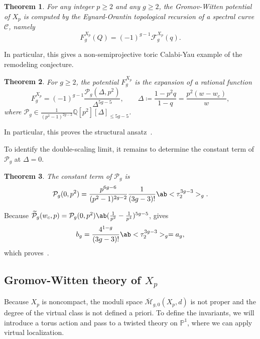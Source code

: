 \documentclass{amsart}
\newtheorem{thm}{Theorem}[section]
\theoremstyle{definition}
\theoremstyle{remark}
\theoremstyle{plain}
\theoremstyle{definition}
\theoremstyle{remark}
\newcommand{\Q}{\mathbb{Q}}
\renewcommand{\P}{\mathbb{P}}
\newcommand{\Mbar}{\overline{\mathcal{M}}}
\newcommand{\mc}[1]{\mathcal{#1}}
\newcommand{\wt}[1]{\widetilde{#1}}
\newcommand{\1}{\mathbf{1}}
\newcommand{\2}{\mathbf{2}}
\newcommand{\3}{\mathbf{3}}
\begin{document}
\begin{thm}%
\label{thm:local P1 mirror symmetry}
    For any integer \(p \geq 2\) and any \(g \geq 2\), the Gromov-Witten potential of \(X_p\) is computed by the Eynard-Orantin topological recursion of a spectral curve \(\mc{C}\), namely
    \[ F_g^{X_p}(Q) = (-1)^{g-1}\mc{F}_g^{X_p}(q). \]
\end{thm}

In particular, this gives a non-semiprojective toric Calabi-Yau example of the remodeling conjecture.

\begin{thm}%
\label{thm:local P1 rationality}
    For \(g \geq 2\), the potential \(F_g^{X_p}\) is the expansion of a rational function
    \[ F_g^{X_p} = (-1)^{g-1}\frac{\mc{P}_g(\Delta,p^2)}{\Delta^{5g-5}}, \qquad \Delta \coloneqq \frac{1-p^2q}{1-q} = \frac{p^2(w-w_c)}{w}, \]
    where \(\mc{P}_g \in \frac{1}{(p^2-1)^{2g-2}}\Q[p^2][\Delta]_{\leq 5g-5}\).
\end{thm}

In particular, this proves the structural ansatz~.

To identify the double-scaling limit, it remains to determine the constant term of \(\mc{P}_g\) at \(\Delta = 0\).

\begin{thm}%
\label{thm:local P1 constant term}
    The constant term of \(\mc{P}_g\) is
    \[ \mc{P}_g(0,p^2) = \frac{p^{6g-6}}{(p^2-1)^{2g-2}}\frac{1}{(3g-3)!}\ab<\tau_2^{3g-3}>_g. \]
\end{thm}

Because \(\wt{\mc{P}}_g(w_c,p) = \mc{P}_g(0,p^2)\ab(\frac{1}{p^2}-\frac{1}{p^4})^{5g-5}\),  gives
\[ b_g = \frac{4^{1-g}}{(3g-3)!}\ab<\tau_2^{3g-3}>_g = a_g, \]
which proves~.

\subsection{Gromov-Witten theory of \(X_p\)}%
\label{sub:Gromov-Witten theory of Xp}

Because \(X_p\) is noncompact, the moduli space \(\Mbar_{g,0}(X_p,d)\) is not proper and the degree of the virtual class is not defined a priori. To define the invariants, we will introduce a torus action and pass to a twisted theory on \(\P^1\), where we can apply virtual localization.
\end{document}
